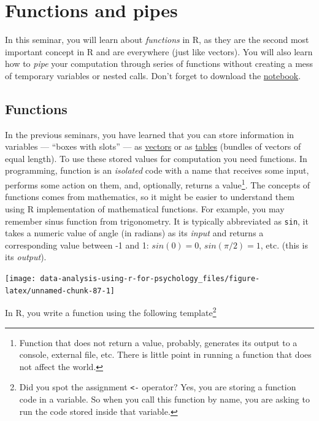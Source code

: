\documentclass[
]{book}
\begin{document}
\hypertarget{seminar05}{%
\chapter{Functions and pipes}\label{seminar05}}

In this seminar, you will learn about \emph{functions} in R, as they are the second most important concept in R and are everywhere (just like vectors). You will also learn how to \emph{pipe} your computation through series of functions without creating a mess of temporary variables or nested calls. Don't forget to download the \href{notebooks/Seminar\%2005\%20-\%20functions.Rmd}{notebook}.

\hypertarget{functions}{%
\section{Functions}\label{functions}}

In the previous seminars, you have learned that you can store information in variables --- ``boxes with slots'' --- as \protect\hyperlink{vectors}{vectors} or as \protect\hyperlink{ux5cux23tables}{tables} (bundles of vectors of equal length). To use these stored values for computation you need functions. In programming, function is an \emph{isolated} code with a name that receives some input, performs some action on them, and, optionally, returns a value\footnote{Function that does not return a value, probably, generates its output to a console, external file, etc. There is little point in running a function that does not affect the world.}. The concepts of functions comes from mathematics, so it might be easier to understand them using R implementation of mathematical functions. For example, you may remember sinus function from trigonometry. It is typically abbreviated as \texttt{sin}, it takes a numeric value of angle (in radians) as its \emph{input} and returns a corresponding value between -1 and 1: \(sin(0) = 0\), \(sin(\pi/2) = 1\), etc. (this is its \emph{output}).

\begin{center}\texttt{[image: data-analysis-using-r-for-psychology\_files/figure-latex/unnamed-chunk-87-1]} \end{center}

In R, you write a function using the following template\footnote{Did you spot the assignment \texttt{\textless{}-} operator? Yes, you are storing a function code in a variable. So when you call this function by name, you are asking to run the code stored inside that variable.}
\end{document}

